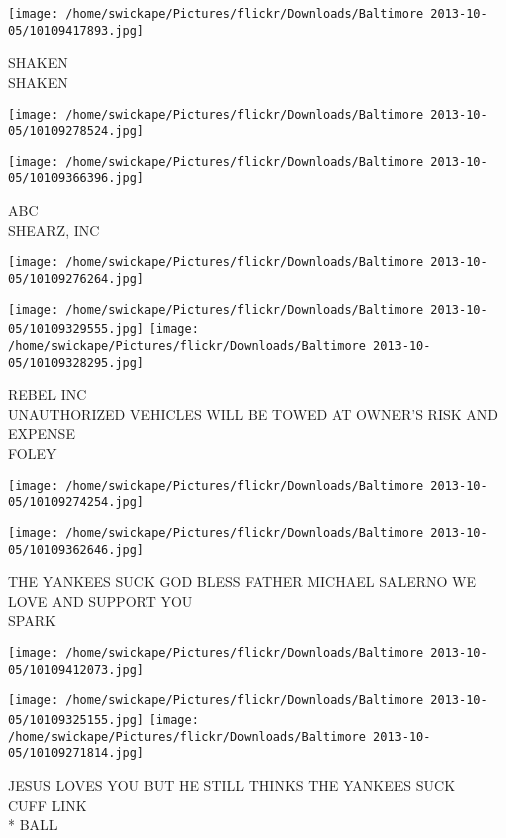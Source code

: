 \documentclass[10pt,letterpaper]{article}
\begin{document}
\vspace{0.25in}
\texttt{[image: /home/swickape/Pictures/flickr/Downloads/Baltimore 2013-10-05/10109417893.jpg]}

SHAKEN\\
SHAKEN
\pagebreak

\texttt{[image: /home/swickape/Pictures/flickr/Downloads/Baltimore 2013-10-05/10109278524.jpg]}

\vspace{0.25in}
\texttt{[image: /home/swickape/Pictures/flickr/Downloads/Baltimore 2013-10-05/10109366396.jpg]}

ABC\\
SHEARZ, INC
\pagebreak

\texttt{[image: /home/swickape/Pictures/flickr/Downloads/Baltimore 2013-10-05/10109276264.jpg]}

\vspace{0.25in}
\texttt{[image: /home/swickape/Pictures/flickr/Downloads/Baltimore 2013-10-05/10109329555.jpg]}
\texttt{[image: /home/swickape/Pictures/flickr/Downloads/Baltimore 2013-10-05/10109328295.jpg]}

REBEL INC\\
UNAUTHORIZED VEHICLES WILL BE TOWED AT OWNER'S RISK AND EXPENSE\\
FOLEY
\pagebreak

\texttt{[image: /home/swickape/Pictures/flickr/Downloads/Baltimore 2013-10-05/10109274254.jpg]}

\vspace{0.25in}
\texttt{[image: /home/swickape/Pictures/flickr/Downloads/Baltimore 2013-10-05/10109362646.jpg]}

THE YANKEES SUCK GOD BLESS FATHER MICHAEL SALERNO WE LOVE AND SUPPORT YOU\\
SPARK
\pagebreak

\texttt{[image: /home/swickape/Pictures/flickr/Downloads/Baltimore 2013-10-05/10109412073.jpg]}

\vspace{0.25in}
\texttt{[image: /home/swickape/Pictures/flickr/Downloads/Baltimore 2013-10-05/10109325155.jpg]}
\texttt{[image: /home/swickape/Pictures/flickr/Downloads/Baltimore 2013-10-05/10109271814.jpg]}

JESUS LOVES YOU BUT HE STILL THINKS THE YANKEES SUCK\\
CUFF LINK\\
* BALL
\pagebreak
\end{document}
